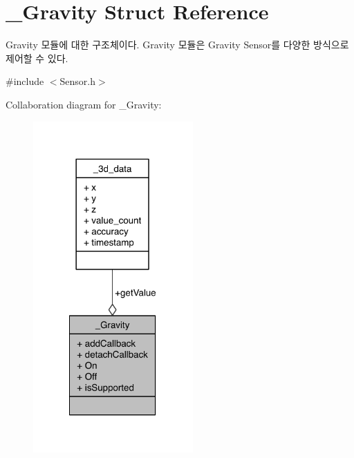 \hypertarget{struct__Gravity}{\section{\-\_\-\-Gravity Struct Reference}
\label{struct__Gravity}
}


Gravity 모듈에 대한 구조체이다. Gravity 모듈은 Gravity Sensor를 다양한 방식으로 제어할 수 있다.  




{\ttfamily \#include $<$Sensor.\-h$>$}



Collaboration diagram for \-\_\-\-Gravity\-:\nopagebreak
\begin{figure}[H]
\begin{center}
\leavevmode
\includegraphics[width=173pt]{d1/d28/struct__Gravity__coll__graph}
\end{center}
\end{figure}
